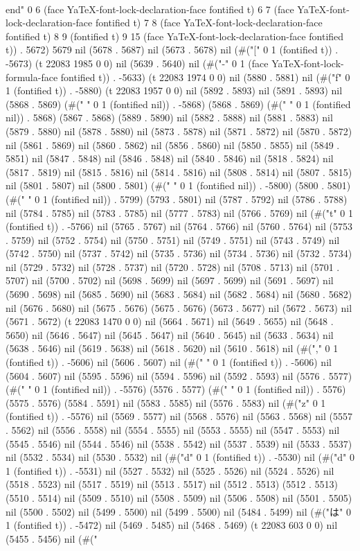 \\end{}" 0 6 (face YaTeX-font-lock-declaration-face fontified t) 6 7 (face YaTeX-font-lock-declaration-face fontified t) 7 8 (face YaTeX-font-lock-declaration-face fontified t) 8 9 (fontified t) 9 15 (face YaTeX-font-lock-declaration-face fontified t)) . 5672) 5679 nil (5678 . 5687) nil (5673 . 5678) nil (#("[" 0 1 (fontified t)) . -5673) (t 22083 1985 0 0) nil (5639 . 5640) nil (#("-" 0 1 (face YaTeX-font-lock-formula-face fontified t)) . -5633) (t 22083 1974 0 0) nil (5880 . 5881) nil (#("f" 0 1 (fontified t)) . -5880) (t 22083 1957 0 0) nil (5892 . 5893) nil (5891 . 5893) nil (5868 . 5869) (#(" " 0 1 (fontified nil)) . -5868) (5868 . 5869) (#(" " 0 1 (fontified nil)) . 5868) (5867 . 5868) (5889 . 5890) nil (5882 . 5888) nil (5881 . 5883) nil (5879 . 5880) nil (5878 . 5880) nil (5873 . 5878) nil (5871 . 5872) nil (5870 . 5872) nil (5861 . 5869) nil (5860 . 5862) nil (5856 . 5860) nil (5850 . 5855) nil (5849 . 5851) nil (5847 . 5848) nil (5846 . 5848) nil (5840 . 5846) nil (5818 . 5824) nil (5817 . 5819) nil (5815 . 5816) nil (5814 . 5816) nil (5808 . 5814) nil (5807 . 5815) nil (5801 . 5807) nil (5800 . 5801) (#(" " 0 1 (fontified nil)) . -5800) (5800 . 5801) (#(" " 0 1 (fontified nil)) . 5799) (5793 . 5801) nil (5787 . 5792) nil (5786 . 5788) nil (5784 . 5785) nil (5783 . 5785) nil (5777 . 5783) nil (5766 . 5769) nil (#("t" 0 1 (fontified t)) . -5766) nil (5765 . 5767) nil (5764 . 5766) nil (5760 . 5764) nil (5753 . 5759) nil (5752 . 5754) nil (5750 . 5751) nil (5749 . 5751) nil (5743 . 5749) nil (5742 . 5750) nil (5737 . 5742) nil (5735 . 5736) nil (5734 . 5736) nil (5732 . 5734) nil (5729 . 5732) nil (5728 . 5737) nil (5720 . 5728) nil (5708 . 5713) nil (5701 . 5707) nil (5700 . 5702) nil (5698 . 5699) nil (5697 . 5699) nil (5691 . 5697) nil (5690 . 5698) nil (5685 . 5690) nil (5683 . 5684) nil (5682 . 5684) nil (5680 . 5682) nil (5676 . 5680) nil (5675 . 5676) (5675 . 5676) (5673 . 5677) nil (5672 . 5673) nil (5671 . 5672) (t 22083 1470 0 0) nil (5664 . 5671) nil (5649 . 5655) nil (5648 . 5650) nil (5646 . 5647) nil (5645 . 5647) nil (5640 . 5645) nil (5633 . 5634) nil (5638 . 5646) nil (5619 . 5638) nil (5618 . 5620) nil (5610 . 5618) nil (#("," 0 1 (fontified t)) . -5606) nil (5606 . 5607) nil (#(" " 0 1 (fontified t)) . -5606) nil (5604 . 5607) nil (5595 . 5596) nil (5594 . 5596) nil (5592 . 5593) nil (5576 . 5577) (#(" " 0 1 (fontified nil)) . -5576) (5576 . 5577) (#(" " 0 1 (fontified nil)) . 5576) (5575 . 5576) (5584 . 5591) nil (5583 . 5585) nil (5576 . 5583) nil (#("z" 0 1 (fontified t)) . -5576) nil (5569 . 5577) nil (5568 . 5576) nil (5563 . 5568) nil (5557 . 5562) nil (5556 . 5558) nil (5554 . 5555) nil (5553 . 5555) nil (5547 . 5553) nil (5545 . 5546) nil (5544 . 5546) nil (5538 . 5542) nil (5537 . 5539) nil (5533 . 5537) nil (5532 . 5534) nil (5530 . 5532) nil (#("d" 0 1 (fontified t)) . -5530) nil (#("d" 0 1 (fontified t)) . -5531) nil (5527 . 5532) nil (5525 . 5526) nil (5524 . 5526) nil (5518 . 5523) nil (5517 . 5519) nil (5513 . 5517) nil (5512 . 5513) (5512 . 5513) (5510 . 5514) nil (5509 . 5510) nil (5508 . 5509) nil (5506 . 5508) nil (5501 . 5505) nil (5500 . 5502) nil (5499 . 5500) nil (5499 . 5500) nil (5484 . 5499) nil (#("は" 0 1 (fontified t)) . -5472) nil (5469 . 5485) nil (5468 . 5469) (t 22083 603 0 0) nil (5455 . 5456) nil (#("
